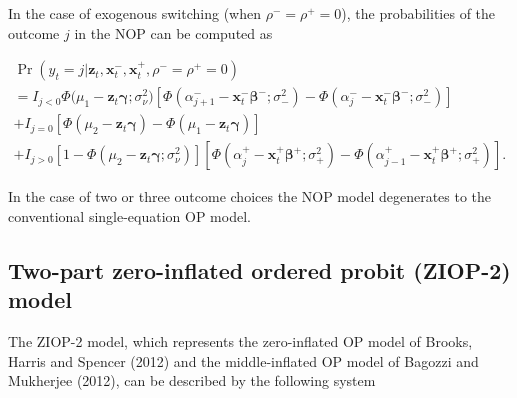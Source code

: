 \documentclass[letterpaper,fleqn,12pt]{article}
\begin{document}
In the case of exogenous switching (when $\rho ^{-}=\rho ^{+}=0$), the
probabilities of the outcome $j$ in the NOP can be computed as

\begin{center}
$%
\begin{array}{l}
\Pr (y_{t}=j|\mathbf{z}_{t},\mathbf{x}_{t}^{-},\mathbf{x}_{t}^{+},\rho
^{-}=\rho ^{+}=0) \\ 
=I_{j<0}\Phi (\mu _{1}-\mathbf{z}_{t}\mathbf{\gamma ;}\sigma _{\nu }^{2}%
\mathbf{)}[\Phi (\alpha _{j+1}^{-}-\mathbf{x}_{t}^{-}\mathbf{\beta }%
^{-};\sigma _{-}^{2})-\Phi (\alpha _{j}^{-}-\mathbf{x}_{t}^{-}\mathbf{\beta }%
^{-};\sigma _{-}^{2})] \\ 
+I_{j=0}[\Phi (\mu _{2}-\mathbf{z}_{t}\mathbf{\gamma })-\Phi (\mu _{1}-%
\mathbf{z}_{t}\mathbf{\gamma })] \\ 
+I_{j>0}[1-\Phi (\mu _{2}-\mathbf{z}_{t}\mathbf{\gamma ;}\sigma _{\nu
}^{2})][\Phi (\alpha _{j}^{+}-\mathbf{x}_{t}^{+}\mathbf{\beta }^{+};\sigma
_{+}^{2})-\Phi (\alpha _{j-1}^{+}-\mathbf{x}_{t}^{+}\mathbf{\beta }%
^{+};\sigma _{+}^{2})]\text{.}%
\end{array}%
$
\end{center}

In the case of two or three outcome choices the NOP model degenerates to the
conventional single-equation OP model.

\subsection{Two-part zero-inflated ordered probit (ZIOP-2) model}

The ZIOP-2 model, which represents the zero-inflated OP model of Brooks,
Harris and Spencer (2012) and the middle-inflated OP model of Bagozzi and
Mukherjee (2012), can be described by the following system

\medskip
\end{document}
